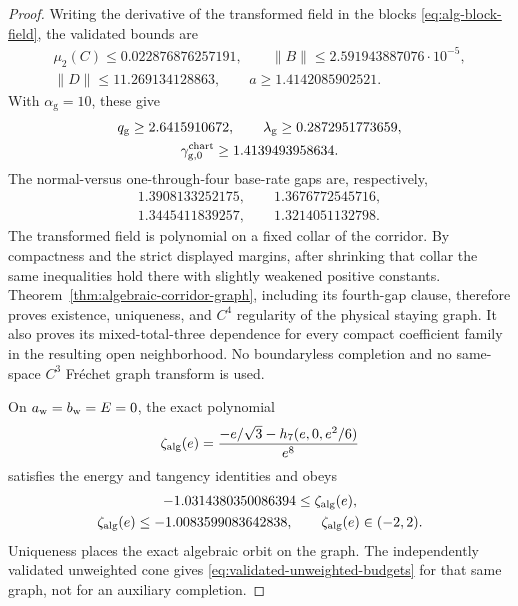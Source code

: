 \documentclass[11pt]{amsart}
\numberwithin{equation}{section}
\theoremstyle{definition}
\theoremstyle{remark}
\begin{document}
\begin{proof}
Writing the derivative of the transformed field in the blocks
\eqref{eq:alg-block-field}, the validated bounds are
\begin{equation}\label{eq:validated-algebraic-block-bounds}
 \begin{gathered}
 \mu_2(C)\le0.022876876257191,\qquad
 \|B\|\le2.591943887076\cdot10^{-5},\\
 \|D\|\le11.269134128863,\qquad
 a\ge1.4142085902521.
 \end{gathered}
\end{equation}
With $\alpha_{\mathrm g}=10$, these give
\begin{equation}\label{eq:validated-algebraic-cone-rates}
 \begin{gathered}
 q_{\mathrm g}\ge2.6415910672,\qquad
 \lambda_{\mathrm g}\ge0.2872951773659,\\
 \gamma^{\rm chart}_{\mathrm g,0}\ge1.4139493958634.
 \end{gathered}
\end{equation}
The normal-versus one-through-four base-rate gaps are, respectively,
\begin{equation}\label{eq:validated-four-rate-gaps}
 \begin{gathered}
 1.3908133252175,\qquad 1.3676772545716,\\
 1.3445411839257,\qquad 1.3214051132798.
 \end{gathered}
\end{equation}
The transformed field is polynomial on a fixed collar of the corridor.
By compactness and the strict displayed margins, after shrinking that
collar the same inequalities hold there with slightly weakened positive
constants.
Theorem~\ref{thm:algebraic-corridor-graph}, including its fourth-gap
clause, therefore proves existence, uniqueness, and $C^4$ regularity of
the physical staying graph.  It also proves its mixed-total-three
dependence for every compact coefficient family in the resulting open
neighborhood.  No boundaryless completion and no same-space
$C^3$ Fr\'echet graph transform is used.

On $a_{\rm w}=b_{\rm w}=E=0$, the exact polynomial
\begin{equation}\label{eq:validated-algebraic-zeta}
 \zeta_{\rm alg}(e)
 =\frac{-e/\sqrt3-h_7(e,0,e^2/6)}{e^8}
\end{equation}
satisfies the energy and tangency identities and obeys
\begin{equation}\label{eq:validated-algebraic-zeta-range}
 \begin{gathered}
 -1.0314380350086394\le \zeta_{\rm alg}(e),\\
 \zeta_{\rm alg}(e)\le-1.0083599083642838,
 \qquad \zeta_{\rm alg}(e)\in(-2,2).
 \end{gathered}
\end{equation}
Uniqueness places the exact algebraic orbit on the graph.  The independently
validated unweighted cone gives \eqref{eq:validated-unweighted-budgets} for
that same graph, not for an auxiliary completion.


\end{proof}
\end{document}
